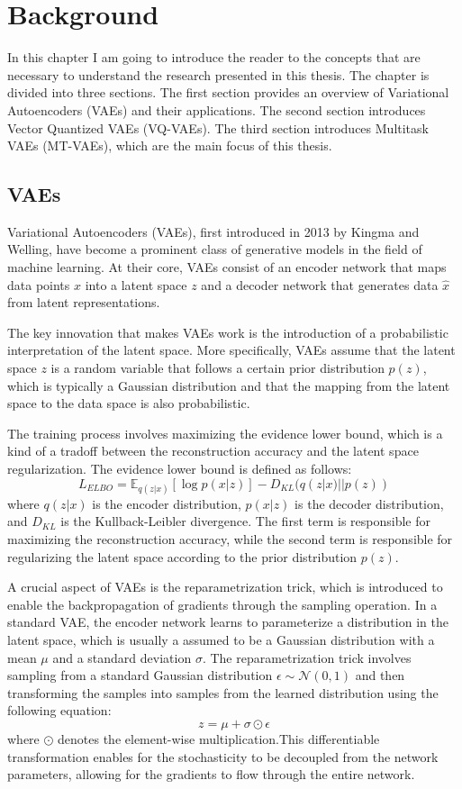 \chapter{Background}

In this chapter I am going to introduce the reader to the concepts that are necessary to understand the research presented in this thesis. The chapter is divided into three sections. The first section provides an overview of Variational Autoencoders (VAEs) and their applications. The second section introduces Vector Quantized VAEs (VQ-VAEs). The third section introduces Multitask VAEs (MT-VAEs), which are the main focus of this thesis.

\section{VAEs}

Variational Autoencoders (VAEs), first introduced in 2013 by Kingma and Welling\cite{kingma2022autoencoding}, have become a prominent class of generative models in the field of machine learning.  At their core, VAEs consist of an encoder network that maps data points $x$ into a latent space $z$ and a decoder network that generates data $\hat{x}$ from latent representations\cite{Kingma_2019}. 

The key innovation that makes VAEs work is the introduction of a probabilistic interpretation of the latent space. More specifically, VAEs assume that the latent space $z$ is a random variable that follows a certain prior distribution $p(z)$, which is typically a Gaussian distribution and that the mapping from the latent space to the data space is also probabilistic\cite{kingma2022autoencoding}.

The training process involves maximizing the evidence lower bound, which is a kind of a tradoff between the reconstruction accuracy and the latent space regularization. The evidence lower bound is defined as follows: \[ L_{ELBO} = \mathbb{E}_{q(z|x)}[\log p(x|z)] - D_{KL}(q(z|x)||p(z)) \] where $q(z|x)$ is the encoder distribution, $p(x|z)$ is the decoder distribution, and $D_{KL}$ is the Kullback-Leibler divergence\cite{kingma2022autoencoding}. The first term is responsible for maximizing the reconstruction accuracy, while the second term is responsible for regularizing the latent space according to the prior distribution $p(z)$.

A crucial aspect of VAEs is the reparametrization trick, which is introduced to enable the backpropagation of gradients through the sampling operation. In a standard VAE, the encoder network learns to parameterize a distribution in the latent space, which is usually a assumed to be a Gaussian distribution with a mean $\mu$ and a standard deviation $\sigma$. The reparametrization trick involves sampling from a standard Gaussian distribution $\epsilon \sim \mathcal{N}(0,1)$ and then transforming the samples into samples from the learned distribution using the following equation: \[ z = \mu + \sigma \odot \epsilon \] where $\odot$ denotes the element-wise multiplication\cite{kingma2022autoencoding}.This differentiable transformation enables for the stochasticity to be decoupled from the network parameters, allowing for the gradients to flow through the entire network.

